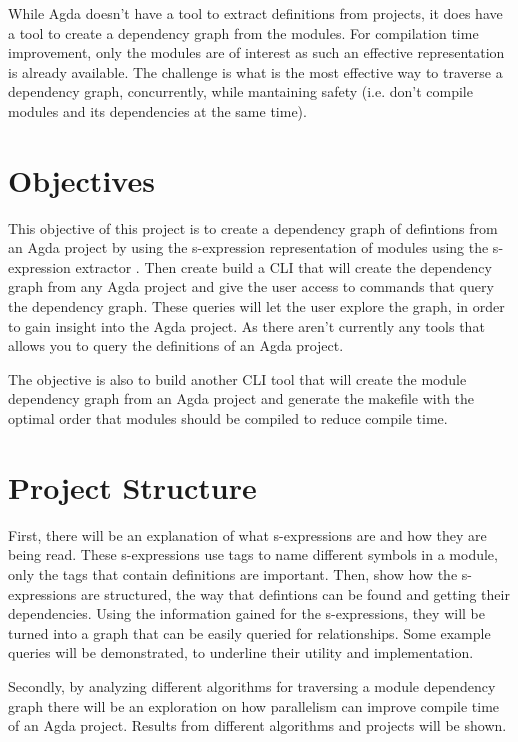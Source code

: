 While Agda doesn't have a tool to extract definitions from projects, it does
have a tool to create a dependency graph from the modules. For compilation time
improvement, only the modules are of interest as such an effective
representation is already available. The challenge is what is the most
effective way to traverse a dependency graph, concurrently, while mantaining
safety (i.e. don't compile modules and its dependencies at the same time). 


\section{Objectives}

This objective of this project is to create a dependency graph of defintions
from an Agda project by using the s-expression representation of modules using
the s-expression extractor \cite{andrej}. Then create build a CLI that will
create the dependency graph from any Agda project and give the user access to
commands that query the dependency graph. These queries will let the user
explore the graph, in order to gain insight into the Agda project. As there
aren't currently any tools that allows you to query the definitions of an Agda
project. 

The objective is also to build another CLI tool that will create the module
dependency graph from an Agda project and generate the makefile with the
optimal order that modules should be compiled to reduce compile time.

\section{Project Structure}

First, there will be an explanation of what s-expressions are and how they are
being read. These s-expressions use tags to name different symbols in a module,
only the tags that contain definitions are important. Then, show how the
s-expressions are structured, the way that defintions can be found and getting
their dependencies. Using the information gained for the s-expressions, they
will be turned into a graph that can be easily queried for relationships. Some
example queries will be demonstrated, to underline their utility and
implementation.

Secondly, by analyzing different algorithms for traversing a module dependency
graph there will be an exploration on how parallelism can improve compile time
of an Agda project. Results from different algorithms and projects will be
shown.
